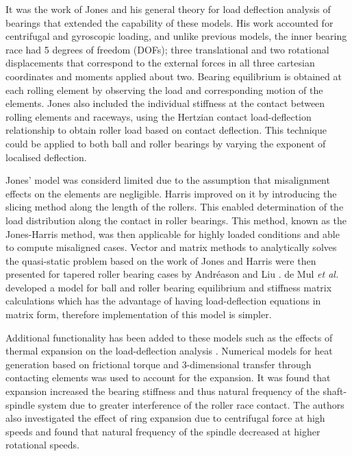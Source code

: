 It was the work of Jones \cite{Jones1960} and his general theory for load deflection analysis of bearings that extended the capability of these models. His work accounted for centrifugal and gyroscopic loading, and unlike previous models, the inner bearing race had 5 degrees of freedom (DOFs); three translational and two rotational displacements that correspond to the external forces in all three cartesian coordinates and moments applied about two. Bearing equilibrium is obtained at each rolling element by observing the load and corresponding motion of the elements. Jones also included the individual stiffness at the contact between rolling elements and raceways, using the Hertzian contact load-deflection relationship to obtain roller load based on contact deflection. This technique could be applied to both ball and roller bearings by varying the exponent of localised deflection. 

Jones' model was considerd limited due to the assumption that misalignment effects on the elements are negligible. Harris \cite{Harris1984} improved on it by introducing the slicing method along the length of the rollers. This enabled determination of the load distribution along the contact in roller bearings. This method, known as the Jones-Harris method, was then applicable for highly loaded conditions and able to compute misaligned cases. Vector and matrix methods to analytically solves the quasi-static problem based on the work of Jones and Harris were then presented for tapered roller bearing cases by Andréason \cite{Andreason1973} and Liu \cite{Liu1976}. de Mul \textit{et al.} \cite{DeMul1989_2} developed a model for ball and roller bearing equilibrium and stiffness matrix calculations which has the advantage of having load-deflection equations in matrix form, therefore implementation of this model is simpler.

Additional functionality has been added to these models such as the effects of thermal expansion on the load-deflection analysis \cite{Jorgensen1997}. Numerical models for heat generation based on frictional torque and 3-dimensional transfer through contacting elements was used to account for the expansion. It was found that expansion increased the bearing stiffness and thus natural frequency of the shaft-spindle system due to greater interference of the roller race contact. The authors also investigated the effect of ring expansion due to centrifugal force at high speeds \cite{Jorgensen1998} and found that natural frequency of the spindle decreased at higher rotational speeds.

